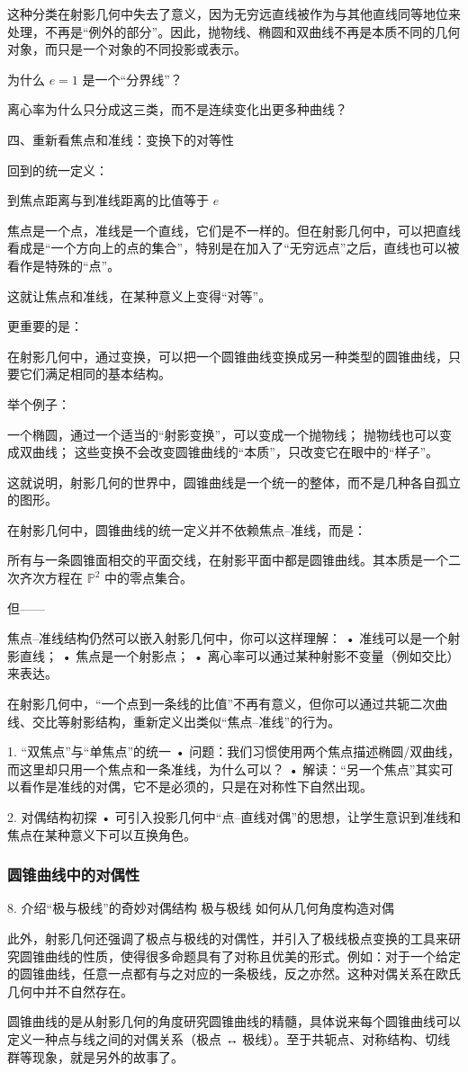 这种分类在射影几何中失去了意义，因为无穷远直线被作为与其他直线同等地位来处理，不再是“例外的部分”。因此，抛物线、椭圆和双曲线不再是本质不同的几何对象，而只是一个对象的不同投影或表示。


为什么 $e=1$ 是一个“分界线”？

离心率为什么只分成这三类，而不是连续变化出更多种曲线？

四、重新看焦点和准线：变换下的对等性

回到的统一定义：

到焦点距离与到准线距离的比值等于 $e$

焦点是一个点，准线是一个直线，它们是不一样的。但在射影几何中，可以把直线看成是“一个方向上的点的集合”，特别是在加入了“无穷远点”之后，直线也可以被看作是特殊的“点”。

这就让焦点和准线，在某种意义上变得“对等”。

更重要的是：

在射影几何中，通过变换，可以把一个圆锥曲线变换成另一种类型的圆锥曲线，只要它们满足相同的基本结构。

举个例子：


一个椭圆，通过一个适当的“射影变换”，可以变成一个抛物线；
抛物线也可以变成双曲线；
这些变换不会改变圆锥曲线的“本质”，只改变它在眼中的“样子”。

这就说明，射影几何的世界中，圆锥曲线是一个统一的整体，而不是几种各自孤立的图形。


在射影几何中，圆锥曲线的统一定义并不依赖焦点–准线，而是：

所有与一条圆锥面相交的平面交线，在射影平面中都是圆锥曲线。其本质是一个二次齐次方程在 $\mathbb{P}^2$ 中的零点集合。

但——

焦点–准线结构仍然可以嵌入射影几何中，你可以这样理解：
	•	准线可以是一个射影直线；
	•	焦点是一个射影点；
	•	离心率可以通过某种射影不变量（例如交比）来表达。

在射影几何中，“一个点到一条线的比值”不再有意义，但你可以通过共轭二次曲线、交比等射影结构，重新定义出类似“焦点–准线”的行为。

1. “双焦点”与“单焦点”的统一
	•	问题：我们习惯使用两个焦点描述椭圆/双曲线，而这里却只用一个焦点和一条准线，为什么可以？
	•	解读：“另一个焦点”其实可以看作是准线的对偶，它不是必须的，只是在对称性下自然出现。

2. 对偶结构初探
	•	可引入投影几何中“点–直线对偶”的思想，让学生意识到准线和焦点在某种意义下可以互换角色。

\subsubsection{圆锥曲线中的对偶性}


	8.	介绍“极与极线”的奇妙对偶结构
极与极线	如何从几何角度构造对偶

此外，射影几何还强调了极点与极线的对偶性，并引入了极线极点变换的工具来研究圆锥曲线的性质，使得很多命题具有了对称且优美的形式。例如：对于一个给定的圆锥曲线，任意一点都有与之对应的一条极线，反之亦然。这种对偶关系在欧氏几何中并不自然存在。

圆锥曲线的是从射影几何的角度研究圆锥曲线的精髓，具体说来每个圆锥曲线可以定义一种点与线之间的对偶关系（极点 ↔ 极线）。至于共轭点、对称结构、切线群等现象，就是另外的故事了。


